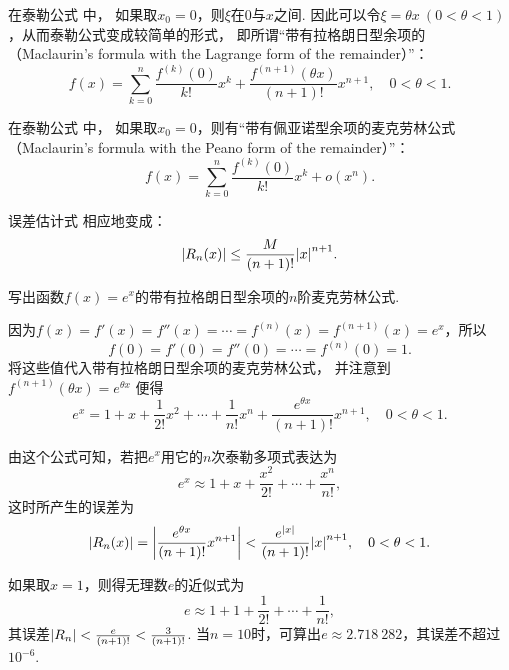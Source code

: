 在泰勒公式  中，
如果取\(x_0 = 0\)，则\(\xi\)在\(0\)与\(x\)之间.
因此可以令\(\xi = \theta x\ (0 < \theta < 1)\)，从而泰勒公式变成较简单的形式，
即所谓“带有拉格朗日型余项的
（Maclaurin's formula with the Lagrange form of the remainder）”：
\begin{equation}\label{equation:微分中值定理.泰勒公式3}
	f(x)=\sum_{k=0}^n \frac{f^{(k)}(0)}{k!} x^k
		+ \frac{f^{(n+1)}(\theta x)}{(n+1)!} x^{n+1},
	\quad 0 < \theta < 1.
\end{equation}

在泰勒公式  中，
如果取\(x_0 = 0\)，则有“带有佩亚诺型余项的麦克劳林公式
（Maclaurin's formula with the Peano form of the remainder）”：
\begin{equation}\label{equation:微分中值定理.泰勒公式4}
	f(x)=\sum_{k=0}^n \frac{f^{(k)}(0)}{k!} x^k + o(x^n).
\end{equation}

误差估计式  相应地变成：
\begin{equation}\label{equation:微分中值定理.泰勒公式.误差2}
	\abs{R_n(x)} \leq \frac{M}{(n+1)!} \abs{x}^{n+1}.
\end{equation}

\begin{example}
写出函数\(f(x) = e^x\)的带有拉格朗日型余项的\(n\)阶麦克劳林公式.
\begin{solution}
因为\(f(x)=f'(x)=f''(x)=\dotsb=f^{(n)}(x)=f^{(n+1)}(x)=e^x\)，所以\[
	f(0)=f'(0)=f''(0)=\dotsb=f^{(n)}(0)=1.
\]
将这些值代入带有拉格朗日型余项的麦克劳林公式，
并注意到\(f^{(n+1)}(\theta x) = e^{\theta x}\)
便得\[
	e^x = 1 + x + \frac{1}{2!} x^2 + \dotsb
	+ \frac{1}{n!} x^n + \frac{e^{\theta x}}{(n+1)!} x^{n+1},
	\quad 0 < \theta < 1.
\]

由这个公式可知，若把\(e^x\)用它的\(n\)次泰勒多项式表达为\[
	e^x \approx 1 + x + \frac{x^2}{2!} + \dotsb + \frac{x^n}{n!},
\]
这时所产生的误差为\[
	\abs{R_n(x)} = \abs{\frac{e^{\theta x}}{(n+1)!} x^{n+1}}
	< \frac{e^{\abs{x}}}{(n+1)!} \abs{x}^{n+1},
	\quad 0 < \theta < 1.
\]

如果取\(x = 1\)，则得无理数\(e\)的近似式为\[
	e \approx 1 + 1 + \frac{1}{2!} + \dotsb + \frac{1}{n!},
\]
其误差\(\abs{R_n} < \frac{e}{(n+1)!} < \frac{3}{(n+1)!}\).
当\(n=10\)时，可算出\(e \approx 2.718\ 282\)，其误差不超过\(10^{-6}\).
\end{solution}
\end{example}

